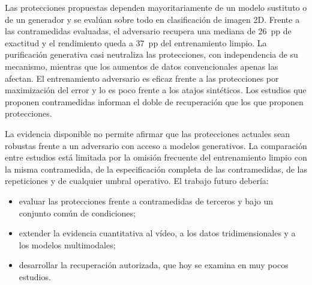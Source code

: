 Las protecciones propuestas dependen mayoritariamente de un modelo sustituto o de un generador y se evalúan sobre todo en clasificación de imagen 2D. Frente a las contramedidas evaluadas, el adversario recupera una mediana de 26~pp de exactitud y el rendimiento queda a 37~pp del entrenamiento limpio. La purificación generativa casi neutraliza las protecciones, con independencia de su mecanismo, mientras que los aumentos de datos convencionales apenas las afectan. El entrenamiento adversario es eficaz frente a las protecciones por maximización del error y lo es poco frente a los atajos sintéticos. Los estudios que proponen contramedidas informan el doble de recuperación que los que proponen protecciones.

La evidencia disponible no permite afirmar que las protecciones actuales sean robustas frente a un adversario con acceso a modelos generativos. La comparación entre estudios está limitada por la omisión frecuente del entrenamiento limpio con la misma contramedida, de la especificación completa de las contramedidas, de las repeticiones y de cualquier umbral operativo. El trabajo futuro debería:
\begin{itemize}
\item evaluar las protecciones frente a contramedidas de terceros y bajo un conjunto común de condiciones;
\item extender la evidencia cuantitativa al vídeo, a los datos tridimensionales y a los modelos multimodales;
\item desarrollar la recuperación autorizada, que hoy se examina en muy pocos estudios.
\end{itemize}
